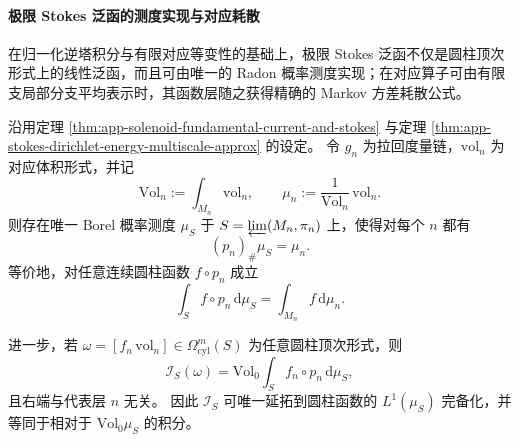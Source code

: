 \paragraph{极限 Stokes 泛函的测度实现与对应耗散}
在归一化逆塔积分与有限对应等变性的基础上，极限 Stokes 泛函不仅是圆柱顶次形式上的线性泛函，而且可由唯一的 Radon 概率测度实现；在对应算子可由有限支局部分支平均表示时，其函数层随之获得精确的 Markov 方差耗散公式。

\begin{theorem}\label{thm:app-solenoid-stokes-radon-measure-realization}
沿用定理 \ref{thm:app-solenoid-fundamental-current-and-stokes} 与定理 \ref{thm:app-stokes-dirichlet-energy-multiscale-approx} 的设定。
令 \(g_n\) 为拉回度量链，\(\mathrm{vol}_n\) 为对应体积形式，并记
\[
\mathrm{Vol}_n:=\int_{M_n}\mathrm{vol}_n,
\qquad
\mu_n:=\frac{1}{\mathrm{Vol}_n}\,\mathrm{vol}_n.
\]
则存在唯一 Borel 概率测度 \(\mu_S\) 于
\(
S=\varprojlim(M_n,\pi_n)
\)
上，使得对每个 \(n\) 都有
\[
(p_n)_\#\mu_S=\mu_n.
\]
等价地，对任意连续圆柱函数 \(f\circ p_n\) 成立
\[
\int_S f\circ p_n\,\mathrm d\mu_S
=
\int_{M_n}f\,\mathrm d\mu_n.
\]

进一步，若 \(\omega=[f_n\,\mathrm{vol}_n]\in\Omega_{\mathrm{cyl}}^m(S)\) 为任意圆柱顶次形式，则
\[
\mathcal I_S(\omega)
=
\mathrm{Vol}_0\int_S f_n\circ p_n\,\mathrm d\mu_S,
\]
且右端与代表层 \(n\) 无关。
因此 \(\mathcal I_S\) 可唯一延拓到圆柱函数的 \(L^1(\mu_S)\) 完备化，并等同于相对于 \(\mathrm{Vol}_0\mu_S\) 的积分。
\end{theorem}
